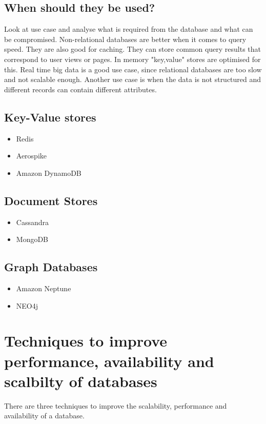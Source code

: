 \subsection{When should they be used?}
Look at use case and analyse what is required from the database and what can be compromised.
Non-relational databases are better when it comes to query speed.
They are also good for caching.
They can store common query results that correspond to user views or pages.
In memory "key,value" stores are optimised for this.
Real time big data is a good use case, since relational databases are too slow and not scalable enough.
Another use case is when the data is not structured and different records can contain different attributes.

\subsection{Key-Value stores}
\begin{itemize}
    \item Redis
    \item Aerospike
    \item Amazon DynamoDB
\end{itemize}

\subsection{Document Stores}
\begin{itemize}
    \item Cassandra
    \item MongoDB
\end{itemize}

\subsection{Graph Databases}
\begin{itemize}
    \item Amazon Neptune
    \item NEO4j
\end{itemize}


\section{Techniques to improve performance, availability and scalbilty of databases}
There are three techniques to improve the scalability, performance and availability of a database.

